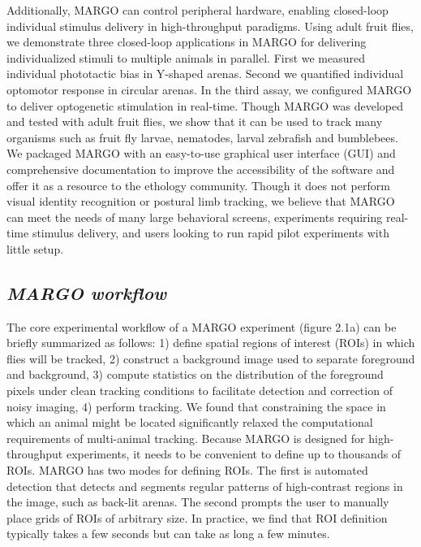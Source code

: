 \documentclass[12pt,letterpaper]{article}
\begin{document}
Additionally, MARGO can control peripheral hardware, enabling closed-loop individual stimulus delivery in high-throughput paradigms. Using adult fruit flies, we demonstrate three closed-loop \cite{heisenberg_wolf_1984} applications in MARGO for delivering individualized stimuli to multiple animals in parallel. First we measured individual phototactic bias in Y-shaped arenas. Second we quantified individual optomotor response in circular arenas. In the third assay, we configured MARGO to deliver optogenetic stimulation in real-time. Though MARGO was developed and tested with adult fruit flies, we show that it can be used to track many organisms such as fruit fly larvae, nematodes, larval zebrafish and bumblebees. We packaged MARGO with an easy-to-use graphical user interface (GUI) and comprehensive documentation to improve the accessibility of the software and offer it as a resource to the ethology community. Though it does not perform visual identity recognition or postural limb tracking, we believe that MARGO can meet the needs of many large behavioral screens, experiments requiring real-time stimulus delivery, and users looking to run rapid pilot experiments with little setup.

\subsection*{\textit{MARGO workflow}}

The core experimental workflow of a MARGO experiment (figure 2.1a) can be briefly summarized as follows: 1) define spatial regions of interest (ROIs) in which flies will be tracked, 2) construct a background image used to separate foreground and background, 3) compute statistics on the distribution of the foreground pixels under clean tracking conditions to facilitate detection and correction of noisy imaging, 4) perform tracking. We found that constraining the space in which an animal might be located significantly relaxed the computational requirements of multi-animal tracking. Because MARGO is designed for high-throughput experiments, it needs to be convenient to define up to thousands of ROIs. MARGO has two modes for defining ROIs. The first is automated detection that detects and segments regular patterns of high-contrast regions in the image, such as back-lit arenas. The second prompts the user to manually place grids of ROIs of arbitrary size. In practice, we find that ROI definition typically takes a few seconds but can take as long a few minutes.
\end{document}
